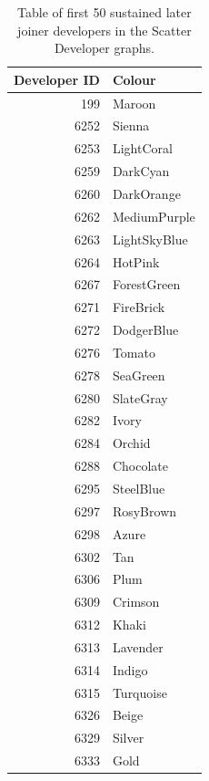 \begin{table}[H]
\centering
\caption{Table of first 50 sustained later joiner developers in the Scatter Developer graphs. } 
\label{tab:first_developers_21sustained_later_joiner}
\begin{tabular}{rl}
\toprule
\textbf{Developer ID} & \textbf{Colour} \\ 
\midrule
199 & \color{Maroon}Maroon \\ 
6252 & \color{Sienna}Sienna \\ 
6253 & \color{LightCoral}LightCoral \\ 
6259 & \color{DarkCyan}DarkCyan \\ 
6260 & \color{DarkOrange}DarkOrange \\ 
6262 & \color{MediumPurple}MediumPurple \\ 
6263 & \color{LightSkyBlue}LightSkyBlue \\ 
6264 & \color{HotPink}HotPink \\ 
6267 & \color{ForestGreen}ForestGreen \\ 
6271 & \color{FireBrick}FireBrick \\ 
6272 & \color{DodgerBlue}DodgerBlue \\ 
6276 & \color{Tomato}Tomato \\ 
6278 & \color{SeaGreen}SeaGreen \\ 
6280 & \color{SlateGray}SlateGray \\ 
6282 & \color{Ivory}Ivory \\ 
6284 & \color{Orchid}Orchid \\ 
6288 & \color{Chocolate}Chocolate \\ 
6295 & \color{SteelBlue}SteelBlue \\ 
6297 & \color{RosyBrown}RosyBrown \\ 
6298 & \color{Azure}Azure \\ 
6302 & \color{Tan}Tan \\ 
6306 & \color{Plum}Plum \\ 
6309 & \color{Crimson}Crimson \\ 
6312 & \color{Khaki}Khaki \\ 
6313 & \color{Lavender}Lavender \\ 
6314 & \color{Indigo}Indigo \\ 
6315 & \color{Turquoise}Turquoise \\ 
6326 & \color{Beige}Beige \\ 
6329 & \color{Silver}Silver \\ 
6333 & \color{Gold}Gold \\ 

\end{tabular}
\end{table}

